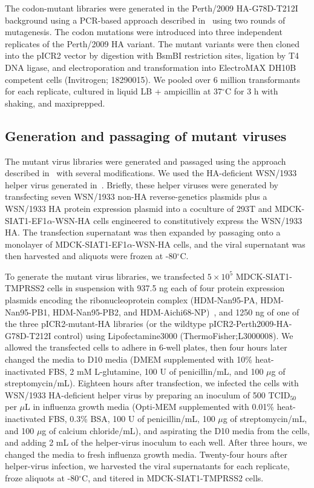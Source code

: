 \documentclass[9pt,twocolumn,twoside]{pnas-new}
\begin{document}
{The codon-mutant libraries were generated in the Perth/2009 HA-G78D-T212I background using a PCR-based approach described in~\cite{bloom2014experimentally,dingens2017comprehensive} using two rounds of mutagenesis.
The codon mutations were introduced into three independent replicates of the Perth/2009 HA variant.
The mutant variants were then cloned into the pICR2 vector by digestion with BsmBI restriction sites, ligation by T4 DNA ligase, and electroporation and transformation into ElectroMAX DH10B competent cells (Invitrogen; 18290015). 
We pooled over 6 million transformants for each replicate, cultured in liquid LB + ampicillin at 37$^{\circ}$C for 3 h with shaking, and maxiprepped.

\subsection*{Generation and passaging of mutant viruses}
The mutant virus libraries were generated and passaged using the approach described in~\cite{doud2016accurate} with several modifications.
We used the HA-deficient WSN/1933 helper virus generated in~\cite{doud2016accurate}.
Briefly, these helper viruses were generated by transfecting seven WSN/1933 non-HA reverse-genetics plasmids plus a WSN/1933 HA protein expression plasmid into a coculture of 293T and MDCK-SIAT1-EF1$\alpha$-WSN-HA cells engineered to constitutively express the WSN/1933 HA.
The transfection supernatant was then expanded by passaging onto a monolayer of MDCK-SIAT1-EF1$\alpha$-WSN-HA cells, and the viral supernatant was then harvested and aliquots were frozen at -80$^{\circ}$C.

To generate the mutant virus libraries, we transfected $5 \times 10^5$ MDCK-SIAT1-TMPRSS2 cells in suspension with 937.5 ng each of four protein expression plasmids encoding the ribonucleoprotein complex (HDM-Nan95-PA, HDM-Nan95-PB1, HDM-Nan95-PB2, and HDM-Aichi68-NP)~\cite{gong2013stability}, and 1250 ng of one of the three pICR2-mutant-HA libraries (or the wildtype pICR2-Perth2009-HA-G78D-T212I control) using Lipofectamine3000 (ThermoFisher;L3000008).
We allowed the transfected cells to adhere in 6-well plates, then four hours later changed the media to D10 media (DMEM supplemented with 10\% heat-inactivated FBS, 2 mM L-glutamine, 100 U of penicillin/mL, and 100 $\mu$g of streptomycin/mL).
Eighteen hours after transfection, we infected the cells with WSN/1933 HA-deficient helper virus by preparing an inoculum of 500 TCID$_{50}$ per $\mu$L in influenza growth media (Opti-MEM supplemented with 0.01\% heat-inactivated FBS, 0.3\% BSA, 100 U of penicillin/mL, 100 $\mu$g of streptomycin/mL, and 100 $\mu$g of calcium chloride/mL), and aspirating the D10 media from the cells, and adding 2 mL of the helper-virus inoculum to each well.
After three hours, we changed the media to fresh influenza growth media.
Twenty-four hours after helper-virus infection, we harvested the viral supernatants for each replicate, froze aliquots at -80$^{\circ}$C, and titered in MDCK-SIAT1-TMPRSS2 cells.

}
\end{document}
